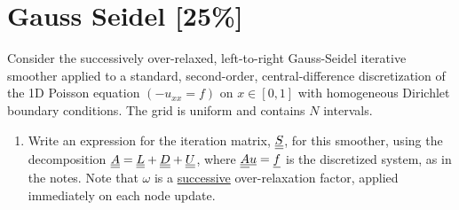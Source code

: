 \pagebreak
\section{Gauss Seidel [25\%]}
Consider the successively over-relaxed, left-to-right Gauss-Seidel iterative smoother applied to a standard, second-order, central-difference discretization of the 1D Poisson equation $(-u_{xx}=f)$ on $x\in [0,1]$ with homogeneous Dirichlet boundary conditions.  The grid is uniform and contains $N$ intervals.

\begin{enumerate}[label=\alph*., start = 1]
    \item Write  an  expression  for  the  iteration  matrix, $\underline{\underline{S}}$,  for  this  smoother,  using  the  decomposition $\underline{\underline{A}}=\underline{\underline{L}}+\underline{\underline{D}}+\underline{\underline{U}}$,  where $\underline{\underline{A}}\underline{u}=\underline{f}$ is the discretized system,  as in the notes.  Note that $\omega$ is a \underline{successive} over-relaxation factor, applied immediately on each node update.
    


\end{enumerate}
